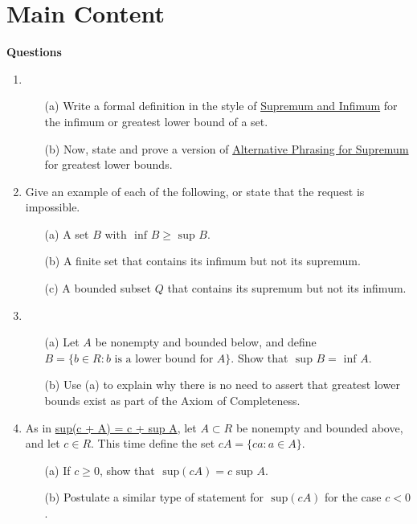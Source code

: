 \section*{Main Content}
\textbf{Questions}\\
\begin{enumerate}
  \item 
    \begin{enumerate}
      \item[(a)] Write a formal definition in the style of \hyperref[202501180743]{Supremum and Infimum} for the infimum or greatest lower bound of a set.
      \item[(b)] Now, state and prove a version of \hyperref[202501181335]{Alternative Phrasing for Supremum} for greatest lower bounds.
    \end{enumerate}
  
  \item Give an example of each of the following, or state that the request is impossible.
    \begin{enumerate}
      \item[(a)] A set $B$ with $\text{ inf } B \geq \text{ sup } B$.
      \item[(b)] A finite set that contains its infimum but not its supremum.
      \item[(c)] A bounded subset $Q$ that contains its supremum but not its infimum.
    \end{enumerate}

  \item 
    \begin{enumerate}
      \item[(a)] Let $A$ be nonempty and bounded below, and define $B = \{b \in R: b \text{ is a lower bound for } A\}$. Show that $\text{ sup } B = \text{ inf } A$.
      \item[(b)] Use (a) to explain why there is no need to assert that greatest lower bounds exist as part of the Axiom of Completeness.
    \end{enumerate}

  \item As in \hyperref[202501181310]{sup(c + A) = c + sup A}, let $A \subset R$ be nonempty and bounded above, and let $c \in R$. This time define the set $cA = \{ca : a \in A\}$.
    \begin{enumerate}
      \item[(a)] If $c \geq 0$, show that $\text{ sup}(cA) = c \text{ sup } A$.
      \item[(b)] Postulate a similar type of statement for $\text{ sup}(cA)$ for the case $c < 0$.
    \end{enumerate}
\end{enumerate}

